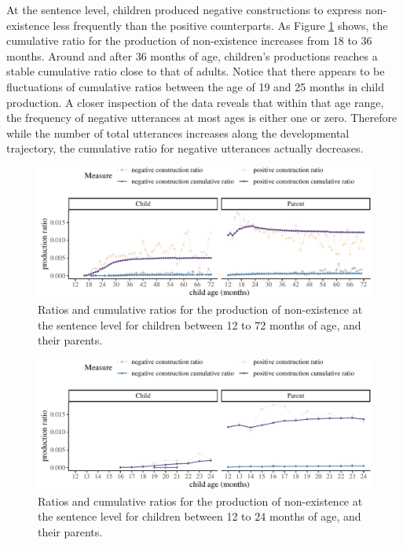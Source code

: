 \documentclass[
  english,
  man,floatsintext]{apa6}
\begin{document}
At the sentence level, children produced negative constructions to express non-existence less frequently than the positive counterparts. As Figure \ref{fig:existence} shows, the cumulative ratio for the production of non-existence increases from 18 to 36 months. Around and after 36 months of age, children's productions reaches a stable cumulative ratio close to that of adults. Notice that there appears to be fluctuations of cumulative ratios between the age of 19 and 25 months in child production. A closer inspection of the data reveals that within that age range, the frequency of negative utterances at most ages is either one or zero. Therefore while the number of total utterances increases along the developmental trajectory, the cumulative ratio for negative utterances actually decreases.

\begin{figure}[H]

{\centering \includegraphics{neg_construction_article_files/figure-latex/existence-1} 

}

\caption{Ratios and cumulative ratios for the production of non-existence at the sentence level for children between 12 to 72 months of age, and their parents.}\label{fig:existence}
\end{figure}

\begin{figure}[H]

{\centering \includegraphics{neg_construction_article_files/figure-latex/existencebegin-1} 

}

\caption{Ratios and cumulative ratios for the production of non-existence at the sentence level for children between 12 to 24 months of age, and their parents.}\label{fig:existencebegin}
\end{figure}
\end{document}
